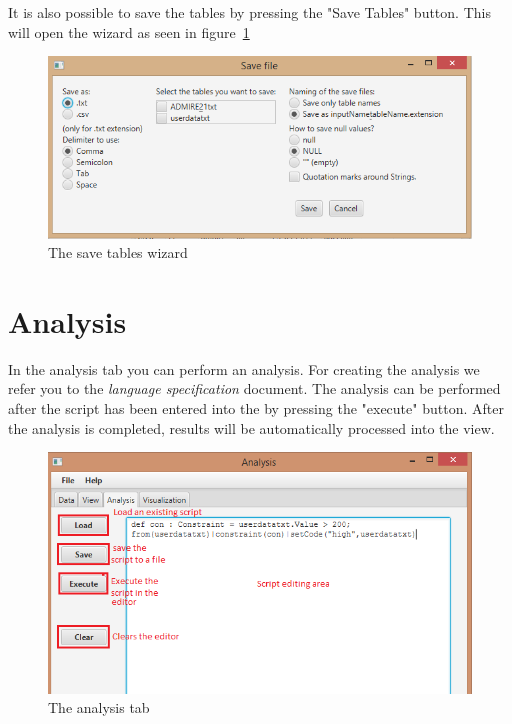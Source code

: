 \documentclass[a4paper]{article}
\begin{document}
It is also possible to save the tables by pressing the "Save Tables" button. This will open the wizard as seen in figure~\ref{fig:savetables}

\begin{figure}[h]
	\centering
	\includegraphics[scale=0.5]{savetables.png}
 	\caption{The save tables wizard}
	\label{fig:savetables}
\end{figure}

\newpage

\section{Analysis}
In the analysis tab you can perform an analysis. For creating the analysis we refer you to the \textit{language specification} document. The analysis can be performed after the script has been entered into the by pressing the "execute" button. After the analysis is completed, results will be automatically processed into the view.
\begin{figure}[h]
	\centering
	\includegraphics[scale=0.5]{analysistab.png}
 	\caption{The analysis tab}
	\label{fig:analysistab}
\end{figure}

\newpage
\end{document}
